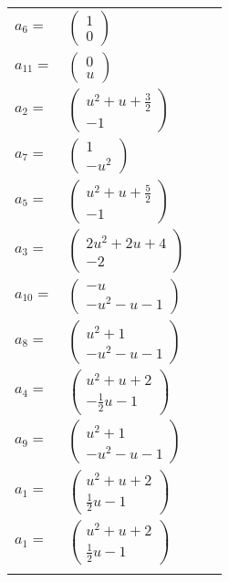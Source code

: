 \documentclass[1p]{elsarticle_modified}
\theoremstyle{definition}
\begin{document}
\begin{tabular}{m{7pt} m{180pt} m{7pt} m{180pt} }
\flushright $a_{6}=$&$\begin{pmatrix}1\\0\end{pmatrix}$ \\
\flushright $a_{11}=$&$\begin{pmatrix}0\\u\end{pmatrix}$ \\
\flushright $a_{2}=$&$\begin{pmatrix}u^2+u+\frac{3}{2}\\-1\end{pmatrix}$ \\
\flushright $a_{7}=$&$\begin{pmatrix}1\\- u^2\end{pmatrix}$ \\
\flushright $a_{5}=$&$\begin{pmatrix}u^2+u+\frac{5}{2}\\-1\end{pmatrix}$ \\
\flushright $a_{3}=$&$\begin{pmatrix}2 u^2+2 u+4\\-2\end{pmatrix}$ \\
\flushright $a_{10}=$&$\begin{pmatrix}- u\\- u^2- u-1\end{pmatrix}$ \\
\flushright $a_{8}=$&$\begin{pmatrix}u^2+1\\- u^2- u-1\end{pmatrix}$ \\
\flushright $a_{4}=$&$\begin{pmatrix}u^2+u+2\\-\frac{1}{2} u-1\end{pmatrix}$ \\
\flushright $a_{9}=$&$\begin{pmatrix}u^2+1\\- u^2- u-1\end{pmatrix}$ \\
\flushright $a_{1}=$&$\begin{pmatrix}u^2+u+2\\\frac{1}{2} u-1\end{pmatrix}$\\ \flushright $a_{1}=$&$\begin{pmatrix}u^2+u+2\\\frac{1}{2} u-1\end{pmatrix}$\\&\end{tabular}
\end{document}
